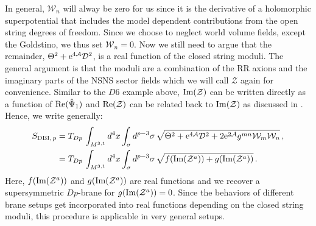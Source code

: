 \documentclass[a4paper,12pt]{report}
\newcommand{\bea}{\begin{equation}\begin{aligned}}
\newcommand{\eea}{\end{aligned}\end{equation}}
\def\rme{{\rm e}}
\def\rmre{{\rm Re}}
\def\rmim{{\rm Im}}
\begin{document}
In general, $\mathcal{W}_n$ will alway be zero for us since it is the derivative of a holomorphic superpotential that includes the model dependent contributions from the open string degrees of freedom. Since we choose to neglect world volume fields, except the Goldstino, we thus set $\mathcal{W}_n = 0$. Now we still need to argue that the remainder, $\Theta^2 + \rme^{4\mathcal{A}} \mathcal{D}^2$, is a real function of the closed string moduli. The general argument is that the moduli are a combination of the RR axions and the imaginary parts of the NSNS sector fields which we will call $\mathcal{Z}$ again for convenience. Similar to the $D6$ example above, $\rmim(\mathcal{Z})$ can be written directly as a function of $\rmre(\hat{\Psi}_1)$ and $\rmre(\mathcal{Z})$ can be related back to $\rmim(\mathcal{Z})$ as discussed in \cite{Grana:2005jc}. Hence, we write generally:
\bea 
S_{\text{DBI},\,p} &= T_{Dp} \, \int_{M^{3,1}} d^4x \int_\sigma d^{p-3}\sigma \, \sqrt{\Theta^2 + \rme^{4\mathcal{A}} \mathcal{D}^2 + 2 \rme^{2\mathcal{A}} g^{mn} \mathcal{W}_m \mathcal{W}_n}\,,\\
&= T_{Dp} \, \int_{M^{3,1}} d^4x \int_\sigma d^{p-3}\sigma \, \sqrt{ f(\rmim(\mathcal{Z}^a))+g(\rmim(\mathcal{Z}^a))}\,.
\eea
Here, $f(\rmim(\mathcal{Z}^a))$ and $g(\rmim(\mathcal{Z}^a))$ are real functions and we recover a supersymmetric $Dp$-brane for $g(\rmim(\mathcal{Z}^a)) = 0$. Since the behaviors of different brane setups get incorporated into real functions depending on the closed string moduli, this procedure is applicable in very general setups.
\end{document}
